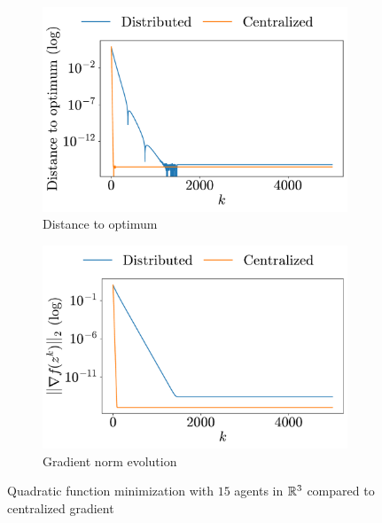 \documentclass[a4paper,11pt,oneside]{book}
\begin{document}
\begin{figure}[t!]
      \centering
      \begin{subfigure}[h]{0.43\linewidth}
            \centering
            \includegraphics[width=\linewidth]{./figs/quadratic/centralized/distance.pdf} 
            \caption{Distance to optimum}
      \end{subfigure}
      \hfill
      \begin{subfigure}[h]{0.43\linewidth}
            \centering
            \includegraphics[width=\linewidth]{./figs/quadratic/centralized/gradient.pdf} 
            \caption{Gradient norm evolution}
      \end{subfigure}
      \caption{Quadratic function minimization with $15$ agents in ${\mathbb{R}}^{3}$ compared to centralized gradient}
      \label{fig:quadratic_centralized_15_3}
\end{figure}
\end{document}
